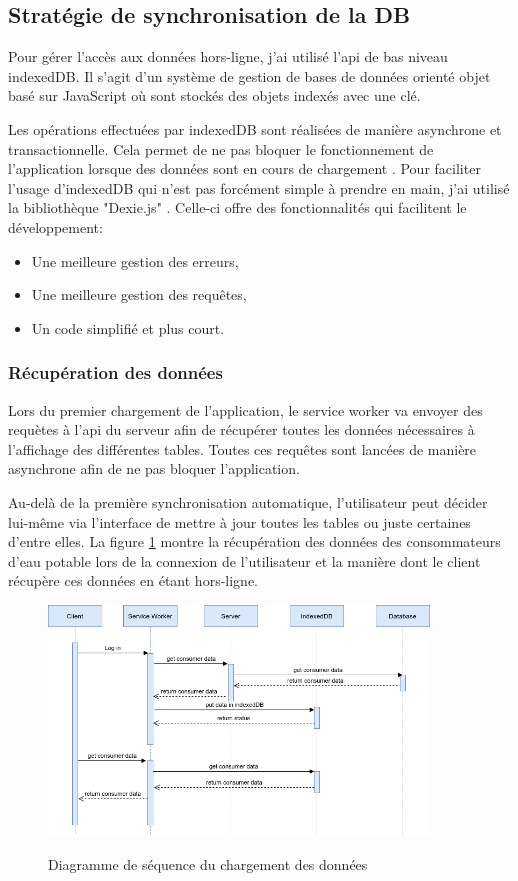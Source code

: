 \documentclass{EPL-master-thesis-covers-FR}
\begin{document}
					
			\subsection{Stratégie de synchronisation de la DB}
				Pour gérer l'accès aux données hors-ligne, j'ai utilisé l'\gls{api} de bas niveau indexedDB. Il s'agit d'un système de gestion de bases de données orienté objet basé sur JavaScript où sont stockés des objets indexés avec une clé. 
				
				Les opérations effectuées par indexedDB sont réalisées de manière asynchrone et transactionnelle. Cela permet de ne pas bloquer le fonctionnement de l'application lorsque des données sont en cours de chargement \cite{ref:indexedDB}. Pour faciliter l'usage d'indexedDB qui n'est pas forcément simple à prendre en main, j'ai utilisé la bibliothèque "Dexie.js" \cite{ref:dexie}. Celle-ci offre des fonctionnalités qui facilitent le développement: 
				\begin{itemize}
					\item Une meilleure gestion des erreurs,
					\item Une meilleure gestion des requêtes,
					\item Un code simplifié et plus court.
				\end{itemize}					
				
				
				\subsubsection*{Récupération des données}
					Lors du premier chargement de l'application, le service worker va envoyer des requètes à l'\gls{api} du serveur afin de récupérer toutes les données nécessaires à l'affichage des différentes tables. Toutes ces requêtes sont lancées de manière asynchrone afin de ne pas bloquer l'application. 
					
					Au-delà de la première synchronisation automatique, l'utilisateur peut décider lui-même via l'interface de mettre à jour toutes les tables ou juste certaines d'entre elles. La figure \ref{fig:recuparation} montre la récupération des données des consommateurs d'eau potable lors de la connexion de l'utilisateur et la manière dont le client récupère ces données en étant hors-ligne.
					
					\begin{figure}[H]
						\centering
						\includegraphics[width=0.9\textwidth]{images/flow}
						\label{fig:recuparation}
						\caption{Diagramme de séquence du chargement des données}
					\end{figure}
				
\end{document}
